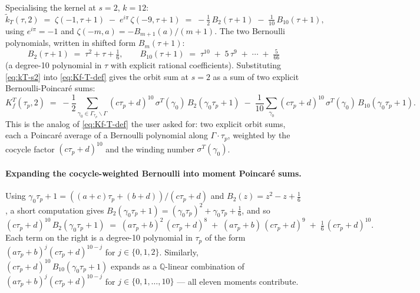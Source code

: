 \documentclass[11pt]{article}
\newcommand{\QQ}{\mathbb{Q}}
\begin{document}
Specialising the kernel at $s = 2$, $k = 12$:
\begin{equation}\label{eq:kT-s2}
  \widetilde{k}_T(\tau, 2)
  \;=\; \zeta(-1, \tau + 1) \;-\; e^{i\pi}\,\zeta(-9, \tau + 1)
  \;=\; -\tfrac{1}{2}\,B_2(\tau + 1) \;-\; \tfrac{1}{10}\,B_{10}(\tau + 1),
\end{equation}
using $e^{i\pi} = -1$ and $\zeta(-m, a) = -B_{m + 1}(a)/(m + 1)$.  The
two Bernoulli polynomials, written in shifted form $B_m(\tau + 1)$:
\begin{equation}\label{eq:Bernoulli-shifted}
  B_2(\tau + 1) \;=\; \tau^2 + \tau + \tfrac{1}{6},
  \qquad
  B_{10}(\tau + 1) \;=\; \tau^{10} \;+\; 5\,\tau^9 \;+\; \cdots
  \;+\; \tfrac{5}{66}
\end{equation}
(a degree-10 polynomial in $\tau$ with explicit rational
coefficients).  Substituting \eqref{eq:kT-s2} into \eqref{eq:Kf-T-def}
gives the orbit sum at $s = 2$ as a sum of two explicit Bernoulli-Poincar\'e sums:
\begin{equation}\label{eq:Kf-T-s2}
  K_f^T(\tau_p, 2)
  \;=\; -\frac{1}{2}\!\!\sum_{\gamma_0 \in \Gamma_{\tau_p}\backslash\Gamma}\!\!
  (c\tau_p + d)^{10}\,\sigma^T(\gamma_0)\,B_2(\gamma_0\tau_p + 1)
  \;-\; \frac{1}{10}\!\!\sum_{\gamma_0}\!\!
  (c\tau_p + d)^{10}\,\sigma^T(\gamma_0)\,B_{10}(\gamma_0\tau_p + 1).
\end{equation}
This is the analog of \eqref{eq:Kf-T-def} the user asked for: two
explicit orbit sums, each a Poincar\'e average of a Bernoulli
polynomial along $\Gamma\cdot\tau_p$, weighted by the cocycle factor
$(c\tau_p + d)^{10}$ and the winding number $\sigma^T(\gamma_0)$.

\paragraph{Expanding the cocycle-weighted Bernoulli into moment Poincar\'e sums.}
Using $\gamma_0\tau_p + 1 = ((a + c)\tau_p + (b + d))/(c\tau_p + d)$
and $B_2(z) = z^2 - z + \tfrac{1}{6}$, a short computation gives
$B_2(\gamma_0\tau_p + 1) = (\gamma_0\tau_p)^2 + \gamma_0\tau_p +
\tfrac{1}{6}$, and so
\begin{equation}\label{eq:cocycle-times-B2}
  (c\tau_p + d)^{10}\,B_2(\gamma_0\tau_p + 1)
  \;=\; (a\tau_p + b)^2\,(c\tau_p + d)^8
  \;+\; (a\tau_p + b)\,(c\tau_p + d)^9
  \;+\; \tfrac{1}{6}\,(c\tau_p + d)^{10}.
\end{equation}
Each term on the right is a degree-10 polynomial in $\tau_p$ of the
form $(a\tau_p + b)^j(c\tau_p + d)^{10 - j}$ for $j \in \{0, 1, 2\}$.
Similarly, $(c\tau_p + d)^{10}\,B_{10}(\gamma_0\tau_p + 1)$ expands as
a $\QQ$-linear combination of $(a\tau_p + b)^j(c\tau_p + d)^{10 - j}$
for $j \in \{0, 1, \ldots, 10\}$ — all eleven moments contribute.
\end{document}
